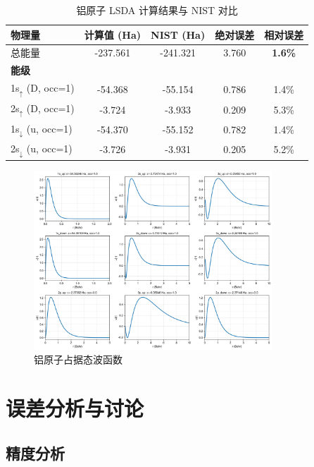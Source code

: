 \documentclass[12pt,a4paper]{article}
\begin{document}
\begin{table}[H]
    \centering
    \caption{铝原子 LSDA 计算结果与 NIST 对比}
    \begin{tabular}{lcccc}
        \toprule
        物理量                        & 计算值 (Ha) & NIST (Ha) & 绝对误差  & 相对误差           \\
        \midrule
        总能量                        & -237.561 & -241.321  & 3.760 & \textbf{1.6\%} \\
        \midrule
        \multicolumn{5}{l}{\textbf{能级}}                                            \\
        1s$_\uparrow$ (D, occ=1)   & -54.368  & -55.154   & 0.786 & 1.4\%          \\
        2s$_\uparrow$ (D, occ=1)   & -3.724   & -3.933    & 0.209 & 5.3\%          \\
        1s$_\downarrow$ (u, occ=1) & -54.370  & -55.152   & 0.782 & 1.4\%          \\
        2s$_\downarrow$ (u, occ=1) & -3.726   & -3.931    & 0.205 & 5.2\%          \\
        \bottomrule
    \end{tabular}
\end{table}

\begin{figure}[H]
    \centering
    \includegraphics[width=0.8\textwidth]{figures/Al_lsda.png}
    \caption{铝原子占据态波函数}
\end{figure}

\section{误差分析与讨论}

\subsection{精度分析}
\end{document}
